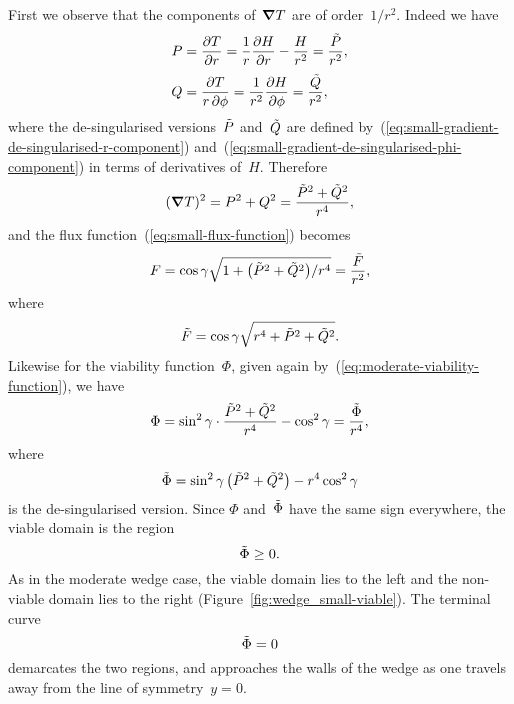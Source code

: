 First we observe that the components of~$\mathop{}\!\boldsymbol{\mathbf{\nabla}} T$ are of order~$1 / r^2$.
Indeed we have
\begin{align}
  P &= \pder{T}{r}
    = \frac{1}{r} \pder{H}{r} - \frac{H}{r^2}
    = \frac{\desing{P}}{r^2},
      \label{eq:small-gradient-r-component} \\[\tallspace]
  Q &= \frac{\pd T}{r \pd\phi}
    = \frac{1}{r^2} \pder{H}{\phi}
    = \frac{\desing{Q}}{r^2},
      \label{eq:small-gradient-phi-component}
\end{align}
where the de-singularised versions~$\tilde{P}$ and~$\tilde{Q}$
are defined by~(\ref{eq:small-gradient-de-singularised-r-component})
and~(\ref{eq:small-gradient-de-singularised-phi-component})
in terms of derivatives of~$H$.
Therefore
\begin{equation}
  (\mathop{}\!\boldsymbol{\mathbf{\nabla}} T)^2
    = P^2 + Q^2
    = \frac{\tilde{P}^2 + \tilde{Q}^2}{r^4},
  \label{eq:small-gradient-squared}
\end{equation}
and the flux function~(\ref{eq:small-flux-function}) becomes
\begin{equation}
  F
    =
      \cos\gamma
      \sqrt{1 + \roundbr*{\desing{P}^2 + \desing{Q}^2} / r^4}
    =
      \frac{\desing{F}}{r^2},
    \label{eq:small-flux-function-singular}
\end{equation}
where
\begin{equation}
  \tilde{F} = \cos\gamma \sqrt{r^4 + \tilde{P}^2 + \tilde{Q}^2}.
  \label{eq:small-flux-function-de-singularised}
\end{equation}
Likewise for the viability function~$\Phi$,
given again by~(\ref{eq:moderate-viability-function}),
we have
\begin{equation}
  \Phi
    =
      \sin^2\gamma \cdot \frac{\tilde{P}^2 + \tilde{Q}^2}{r^4}
      - \cos^2\gamma
    =
      \frac{\tilde{\Phi}}{r^4},
    \label{eq:small-viability-function-singular}
\end{equation}
where
\begin{equation}
  \desing{\Phi} =
    \sin^2\gamma \, \roundbr*{\desing{P}^2 + \desing{Q}^2} - r^4 \cos^2\gamma
  \label{eq:small-viability-function-de-singularised}
\end{equation}
is the de-singularised version.
Since $\Phi$ and~$\tilde{\Phi}$ have the same sign everywhere,
the viable domain is the region
\begin{equation}
  \tilde{\Phi} \ge 0.
  \label{eq:small-viable-domain}
\end{equation}
As in the moderate wedge case,
the viable domain lies to the left
and the non-viable domain lies to the right
(Figure~\ref{fig:wedge_small-viable}).
The terminal curve
\begin{equation}
  \tilde{\Phi} = 0
  \label{eq:small-terminal-curve}
\end{equation}
demarcates the two regions,
and approaches the walls of the wedge
as one travels away from the line of symmetry~$y = 0$.

